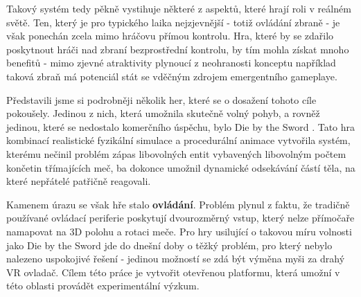 Takový systém tedy pěkně vystihuje některé z aspektů, které hrají roli v reálném světě. Ten, který je pro typického laika nejzjevnější - totiž ovládání zbraně - je však ponechán zcela mimo hráčovu přímou kontrolu. Hra, které by se zdařilo poskytnout hráči nad zbraní bezprostřední kontrolu, by tím mohla získat mnoho benefitů - mimo zjevné atraktivity plynoucí z neohranosti konceptu například taková zbraň má potenciál stát se vděčným zdrojem emergentního gameplaye.

Představili jsme si podrobněji několik her, které se o dosažení tohoto cíle pokoušely. Jedinou z nich, která umožnila skutečně volný pohyb, a rovněž jedinou, které se nedostalo komerčního úspěchu, bylo Die by the Sword \cite{DieByTheSword}. Tato hra kombinací realistické fyzikální simulace a procedurální animace vytvořila systém, kterému nečinil problém zápas libovolných entit vybavených libovolným počtem končetin třímajících meč, ba dokonce umožnil dynamické odsekávání částí těla, na které nepřátelé patřičně reagovali. 

Kamenem úrazu se však hře stalo \textbf{ovládání}. Problém plynul z faktu, že tradičně používané ovládací periferie poskytují dvourozměrný vstup, který nelze přímočaře namapovat na 3D polohu a rotaci meče. Pro hry usilující o takovou míru volnosti jako Die by the Sword jde do dnešní doby o těžký problém, pro který nebylo nalezeno uspokojivé řešení - jedinou možností se zdá být výměna myši za drahý \acs{VR} ovladač. Cílem této práce je vytvořit otevřenou platformu, která umožní v této oblasti provádět experimentální výzkum.

